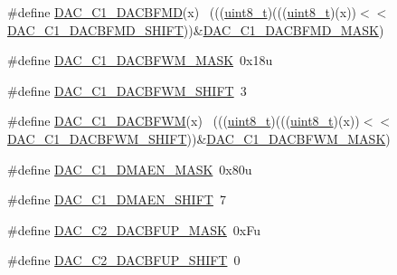 \begin{DoxyCompactItemize}
\item 
\#define \hyperlink{group___d_a_c___register___masks_gaacd61446351eecf90f0c04eed83ef08f}{D\+A\+C\+\_\+\+C1\+\_\+\+D\+A\+C\+B\+F\+MD}(x)                                            ~(((\hyperlink{_p_e___types_8h_aba7bc1797add20fe3efdf37ced1182c5}{uint8\+\_\+t})(((\hyperlink{_p_e___types_8h_aba7bc1797add20fe3efdf37ced1182c5}{uint8\+\_\+t})(x))$<$$<$\hyperlink{group___d_a_c___register___masks_ga779629844ed0967b310e7f2721c54624}{D\+A\+C\+\_\+\+C1\+\_\+\+D\+A\+C\+B\+F\+M\+D\+\_\+\+S\+H\+I\+FT}))\&\hyperlink{group___d_a_c___register___masks_ga28373e4d9ae322da4f6a37933a340b78}{D\+A\+C\+\_\+\+C1\+\_\+\+D\+A\+C\+B\+F\+M\+D\+\_\+\+M\+A\+SK})
\item 
\#define \hyperlink{group___d_a_c___register___masks_gaad89dbfc60735cf12eb6cfff9157fffa}{D\+A\+C\+\_\+\+C1\+\_\+\+D\+A\+C\+B\+F\+W\+M\+\_\+\+M\+A\+SK}~0x18u
\item 
\#define \hyperlink{group___d_a_c___register___masks_gacc4542331c55b93fe589d439a69122f7}{D\+A\+C\+\_\+\+C1\+\_\+\+D\+A\+C\+B\+F\+W\+M\+\_\+\+S\+H\+I\+FT}~3
\item 
\#define \hyperlink{group___d_a_c___register___masks_ga4a605c96af86b2bcbb448a075e1fb76e}{D\+A\+C\+\_\+\+C1\+\_\+\+D\+A\+C\+B\+F\+WM}(x)                                            ~(((\hyperlink{_p_e___types_8h_aba7bc1797add20fe3efdf37ced1182c5}{uint8\+\_\+t})(((\hyperlink{_p_e___types_8h_aba7bc1797add20fe3efdf37ced1182c5}{uint8\+\_\+t})(x))$<$$<$\hyperlink{group___d_a_c___register___masks_gacc4542331c55b93fe589d439a69122f7}{D\+A\+C\+\_\+\+C1\+\_\+\+D\+A\+C\+B\+F\+W\+M\+\_\+\+S\+H\+I\+FT}))\&\hyperlink{group___d_a_c___register___masks_gaad89dbfc60735cf12eb6cfff9157fffa}{D\+A\+C\+\_\+\+C1\+\_\+\+D\+A\+C\+B\+F\+W\+M\+\_\+\+M\+A\+SK})
\item 
\#define \hyperlink{group___d_a_c___register___masks_ga091be41dfd851b71978ab7298c372292}{D\+A\+C\+\_\+\+C1\+\_\+\+D\+M\+A\+E\+N\+\_\+\+M\+A\+SK}~0x80u
\item 
\#define \hyperlink{group___d_a_c___register___masks_ga481f558223c5c36402bebe924bdd00a3}{D\+A\+C\+\_\+\+C1\+\_\+\+D\+M\+A\+E\+N\+\_\+\+S\+H\+I\+FT}~7
\item 
\#define \hyperlink{group___d_a_c___register___masks_ga329015367026aaee34f54edcbaab61bb}{D\+A\+C\+\_\+\+C2\+\_\+\+D\+A\+C\+B\+F\+U\+P\+\_\+\+M\+A\+SK}~0x\+Fu
\item 
\#define \hyperlink{group___d_a_c___register___masks_ga5d43a79719748e490a572fa6cdc75efe}{D\+A\+C\+\_\+\+C2\+\_\+\+D\+A\+C\+B\+F\+U\+P\+\_\+\+S\+H\+I\+FT}~0
\item 

\end{DoxyCompactItemize}
